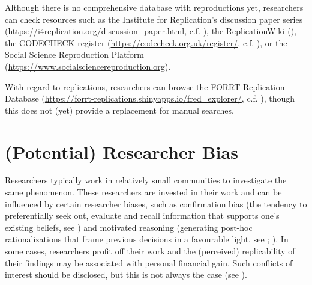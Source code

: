 \documentclass[
  letterpaper,
  DIV=11,
  openany,
  fontsize=12pt,
  parskip=half,
  headings=big,
  numbers=noenddot,
  titlepage=false]{scrreprt}
\begin{document}
Although there is no comprehensive database with reproductions yet,
researchers can check resources such as the Institute for Replication's
discussion paper series
(\url{https://i4replication.org/discussion_paper.html}, c.f.
), the
ReplicationWiki (), the
CODECHECK register (\url{https://codecheck.org.uk/register/}, c.f.
), or the Social
Science Reproduction Platform
(\url{https://www.socialsciencereproduction.org}).

With regard to replications, researchers can browse the FORRT
Replication Database
(\url{https://forrt-replications.shinyapps.io/fred_explorer/}, c.f.
), though this does
not (yet) provide a replacement for manual searches.

\section{(Potential) Researcher Bias}\label{potential-researcher-bias}

Researchers typically work in relatively small communities to
investigate the same phenomenon. These researchers are invested in their
work and can be influenced by certain researcher biases, such as
confirmation bias (the tendency to preferentially seek out, evaluate and
recall information that supports one's existing beliefs, see
) and motivated reasoning
(generating post-hoc rationalizations that frame previous decisions in a
favourable light, see ; ). In some cases, researchers profit off their work and the
(perceived) replicability of their findings may be associated with
personal financial gain. Such conflicts of interest should be disclosed,
but this is not always the case (see
).
\end{document}
